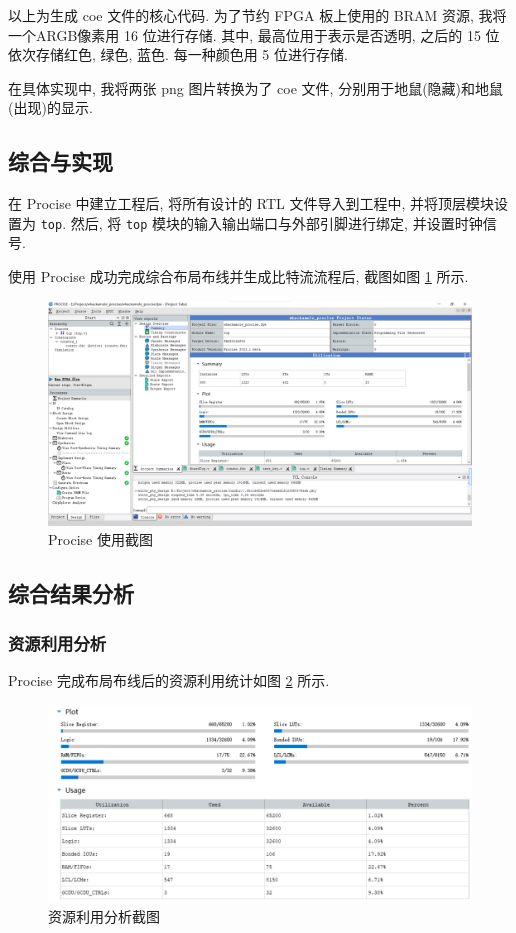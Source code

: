 以上为生成 coe 文件的核心代码. 为了节约 FPGA 板上使用的 BRAM 资源, 我将一个ARGB像素用 16 位进行存储. 
其中, 最高位用于表示是否透明, 之后的 15 位依次存储红色, 绿色, 蓝色. 每一种颜色用 5 位进行存储.

在具体实现中, 我将两张 png 图片转换为了 coe 文件, 分别用于地鼠(隐藏)和地鼠(出现)的显示.

\subsection{综合与实现}

在 Procise 中建立工程后, 将所有设计的 RTL 文件导入到工程中, 并将顶层模块设置为 \texttt{top}. 
然后, 将 \texttt{top} 模块的输入输出端口与外部引脚进行绑定, 并设置时钟信号.

使用 Procise 成功完成综合布局布线并生成比特流流程后, 截图如图 \ref{fig:procise} 所示.

\begin{figure}[htbp]
  \centering
  \includegraphics[width=\textwidth]{res/img/procise.png}
  \caption{Procise 使用截图}
  \label{fig:procise}
\end{figure}

\subsection{综合结果分析}

\subsubsection{资源利用分析}

Procise 完成布局布线后的资源利用统计如图 \ref{fig:resoucesuse} 所示. 

\begin{figure}[htbp]
  \centering
  \includegraphics[width=\textwidth]{res/img/resouces_use.png}
  \caption{资源利用分析截图}
  \label{fig:resoucesuse}
\end{figure}

